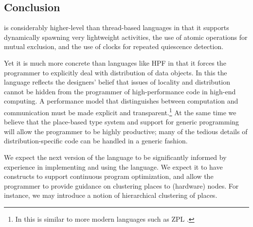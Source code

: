 \subsection{Conclusion}
{}\Xten{} is considerably higher-level than thread-based languages in
that it supports dynamically spawning very lightweight activities, the
use of atomic operations for mutual exclusion, and the use of clocks
for repeated quiescence detection.

Yet it is much more concrete than languages like HPF in that it forces
the programmer to explicitly deal with distribution of data
objects. In this the language reflects the designers' belief that
issues of locality and distribution cannot be hidden from the
programmer of high-performance code in high-end computing.  A
performance model that distinguishes between computation and
communication must be made explicit and transparent.\footnote{In this
\Xten{} is similar to more modern languages such as ZPL \cite{zpl}.}
At the same time we believe that the place-based type system and
support for generic programming will allow the \Xten{} programmer to
be highly productive; many of the tedious details of
distribution-specific code can be handled in a generic fashion.

We expect the next version of the language to be significantly
informed by experience in implementing and using the language. We
expect it to have constructs to support continuous program
optimization, and allow the programmer to provide guidance on
clustering places to (hardware) nodes. For instance, we may introduce
a notion of hierarchical clustering of places.




